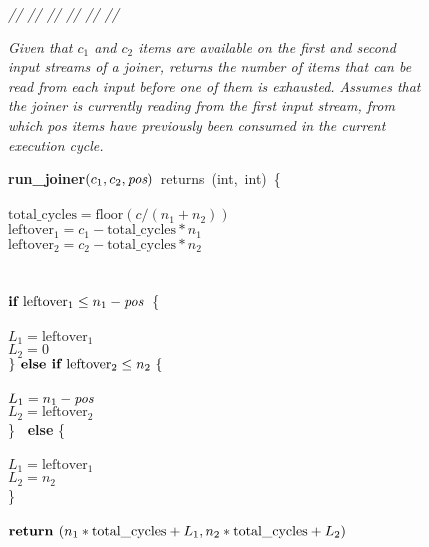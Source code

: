 \begin{figure}[t]
\begin{minipage}{0.1in}
\vspace{-1.75pt}
{\it // // // // // //}
\end{minipage}
\begin{minipage}{3.23in}
{\it Given that $c_1$ and $c_2$ items are available on the first and
  second input streams of a joiner, returns the number of items that
  can be read from each input before one of them is exhausted.
  Assumes that the joiner is currently reading from the first input
  stream, from which \mbox{pos} items have previously been consumed in
  the current execution cycle.}
\end{minipage}
\mbox{\bf run\_joiner}$(c_1, c_2, \mbox{\it pos} )$~returns~(int,~int)~\{\\
\\
\tab$\mbox{total\_cycles} = \mbox{floor}(c/(n_1 + n_2))$\\
\tab$\mbox{leftover}_1 = c_1 - \mbox{total\_cycles} * n_1$\\
\tab$\mbox{leftover}_2 = c_2 - \mbox{total\_cycles} * n_2$\\
~ \\
\\
\tab$\mbox{\bf if~} \mbox{leftover}_1 \leq n_1 - \mbox{\it pos}$~\{\\
\tab{}\\
\tab\tab$L_1 = \mbox{leftover}_1$\\
\tab\tab$L_2 = 0$\\
\tab$\} \mbox{\bf~else if~} \mbox{leftover}_2 \leq n_2~\{$\\
\tab{}\\
\tab\tab$L_1 = n_1-\mbox{\it pos}$\\
\tab\tab$L_2 = \mbox{leftover}_2$\\
\tab\} \mbox{\bf ~else} \{\\
\tab{}\\
\tab\tab$L_1 = \mbox{leftover}_1$\\
\tab\tab$L_2 = n_2$\\
\tab\}\\
~ \\ 
\tab$\mbox{\bf return~}(n_1*\mbox{total\_cycles} + L_1, n_2*\mbox{total\_cycles} + L_2)$

\end{figure}
